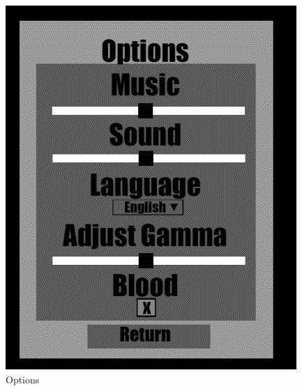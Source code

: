 \begin{figure}[!ht]
	\centering
	\includegraphics[width=\textwidth]{images/image4.png}
	\caption{Options}
	\label{fig:options}
\end{figure}

